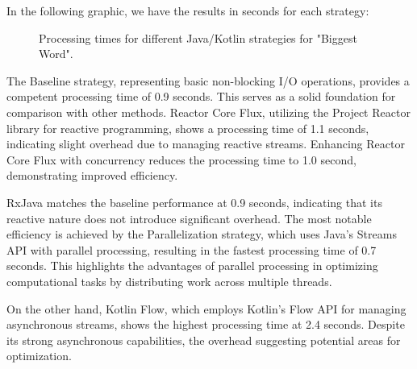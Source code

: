 In the following graphic, we have the results in seconds for each strategy:

\begin{figure}[H]
    \centering
    \caption{Processing times for different Java/Kotlin strategies for "Biggest Word".}
    \label{fig:biggest_word_processing_times_java}
\end{figure}
    

The Baseline strategy, representing basic non-blocking I/O operations, provides a competent processing time of 0.9 seconds. This serves as a solid foundation for comparison with other methods. Reactor Core Flux, utilizing the Project Reactor library for reactive programming, shows a processing time of 1.1 seconds, indicating slight overhead due to managing reactive streams. Enhancing Reactor Core Flux with concurrency reduces the processing time to 1.0 second, demonstrating improved efficiency.

RxJava matches the baseline performance at 0.9 seconds, indicating that its reactive nature does not introduce significant overhead. The most notable efficiency is achieved by the Parallelization strategy, which uses Java's Streams API with parallel processing, resulting in the fastest processing time of 0.7 seconds. This highlights the advantages of parallel processing in optimizing computational tasks by distributing work across multiple threads.

On the other hand, Kotlin Flow, which employs Kotlin's Flow API for managing asynchronous streams, shows the highest processing time at 2.4 seconds. Despite its strong asynchronous capabilities, the overhead suggesting potential areas for optimization.

